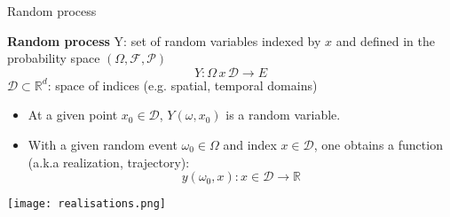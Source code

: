 \documentclass[9pt]{beamer}
\begin{document}
%
%
%
%
%
%
%

\begin{frame}[t]{Random process}

{\bf Random process} Y: set of random variables indexed by $x$ and defined in the probability space $(\Omega, \mathcal{F}, \mathcal{P})$
\[
Y: \Omega \, x \, \mathcal{D} \to E
\]
$\mathcal{D} \subset \mathbb{R}^d$: space of indices (e.g. spatial, temporal domains)

\begin{itemize}
\item At a given point $x_0 \in \mathcal{D}$, $Y(\omega, x_0)$ is a random variable.
\item With a given random event $\omega_0 \in \Omega$ and index $x \in \mathcal{D}$, one obtains a function (a.k.a realization, trajectory):
\[
y(\omega_0, x): x \in \mathcal{D}  \to \mathbb{R} 
\]
\end{itemize}

\begin{center}
\texttt{[image: realisations.png]}
\end{center}

\end{frame}
\end{document}
